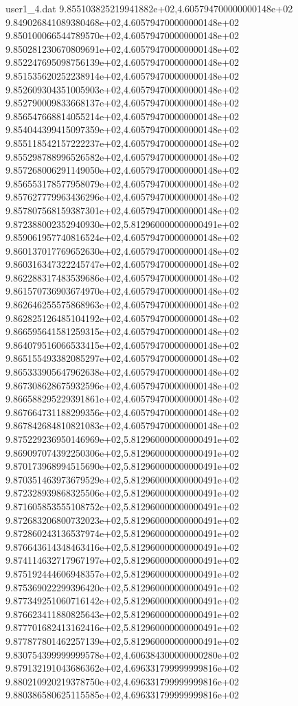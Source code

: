 \begin{filecontents}{user1_4.dat}
9.855103825219941882e+02,4.605794700000000148e+02
9.849026841089380468e+02,4.605794700000000148e+02
9.850100066544789570e+02,4.605794700000000148e+02
9.850281230670809691e+02,4.605794700000000148e+02
9.852247695098756139e+02,4.605794700000000148e+02
9.851535620252238914e+02,4.605794700000000148e+02
9.852609304351005903e+02,4.605794700000000148e+02
9.852790009833668137e+02,4.605794700000000148e+02
9.856547668814055214e+02,4.605794700000000148e+02
9.854044399415097359e+02,4.605794700000000148e+02
9.855118542157222237e+02,4.605794700000000148e+02
9.855298788996526582e+02,4.605794700000000148e+02
9.857268006291149050e+02,4.605794700000000148e+02
9.856553178577958079e+02,4.605794700000000148e+02
9.857627779963436296e+02,4.605794700000000148e+02
9.857807568159387301e+02,4.605794700000000148e+02
9.872388002352940930e+02,5.812960000000000491e+02
9.859061957740816524e+02,4.605794700000000148e+02
9.860137017769652630e+02,4.605794700000000148e+02
9.860316347322245747e+02,4.605794700000000148e+02
9.862288317483539686e+02,4.605794700000000148e+02
9.861570736903674970e+02,4.605794700000000148e+02
9.862646255575868963e+02,4.605794700000000148e+02
9.862825126485104192e+02,4.605794700000000148e+02
9.866595641581259315e+02,4.605794700000000148e+02
9.864079516066533415e+02,4.605794700000000148e+02
9.865155493382085297e+02,4.605794700000000148e+02
9.865333905647962638e+02,4.605794700000000148e+02
9.867308628675932596e+02,4.605794700000000148e+02
9.866588295229391861e+02,4.605794700000000148e+02
9.867664731188299356e+02,4.605794700000000148e+02
9.867842684810821083e+02,4.605794700000000148e+02
9.875229236950146969e+02,5.812960000000000491e+02
9.869097074392250306e+02,5.812960000000000491e+02
9.870173968994515690e+02,5.812960000000000491e+02
9.870351463973679529e+02,5.812960000000000491e+02
9.872328939868325506e+02,5.812960000000000491e+02
9.871605853555108752e+02,5.812960000000000491e+02
9.872683206800732023e+02,5.812960000000000491e+02
9.872860243136537974e+02,5.812960000000000491e+02
9.876643614348463416e+02,5.812960000000000491e+02
9.874114632717967197e+02,5.812960000000000491e+02
9.875192444606948357e+02,5.812960000000000491e+02
9.875369022299396420e+02,5.812960000000000491e+02
9.877349251060716142e+02,5.812960000000000491e+02
9.876623411880825643e+02,5.812960000000000491e+02
9.877701682413162416e+02,5.812960000000000491e+02
9.877877801462257139e+02,5.812960000000000491e+02
9.830754399999999578e+02,4.606384300000000280e+02
9.879132191043686362e+02,4.696331799999999816e+02
9.880210920219378750e+02,4.696331799999999816e+02
9.880386580625115585e+02,4.696331799999999816e+02

\end{filecontents}
